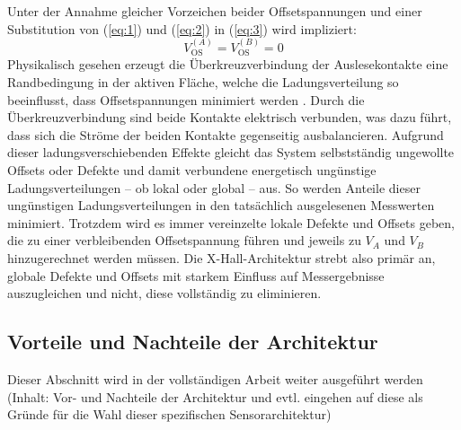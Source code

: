 \documentclass[12pt, a4paper]{article}
\begin{document}
		Unter der Annahme gleicher Vorzeichen beider Offsetspannungen und einer Substitution von (\ref{eq:1}) und (\ref{eq:2}) in (\ref{eq:3}) wird  impliziert:
		\begin{equation}
			V_\mathrm{OS}^{(A)}=V_\mathrm{OS}^{(B)}=0
			\label{eq:4}
		\end{equation}
		Physikalisch gesehen erzeugt die Überkreuzverbindung der Auslesekontakte eine  Randbedingung in der aktiven Fläche, welche die Ladungsverteilung so beeinflusst, dass Offsetspannungen minimiert werden \cite{cres21}. 
		Durch die Überkreuzverbindung sind beide Kontakte elektrisch verbunden, was dazu führt, dass sich die Ströme der beiden Kontakte gegenseitig ausbalancieren. %
		Aufgrund dieser ladungsverschiebenden Effekte gleicht das System selbstständig ungewollte Offsets oder Defekte und damit verbundene energetisch ungünstige Ladungsverteilungen – ob lokal oder global – aus. %
		So werden Anteile dieser ungünstigen Ladungsverteilungen in den tatsächlich ausgelesenen Messwerten minimiert.\newline
		Trotzdem wird es immer vereinzelte lokale Defekte und Offsets geben, die zu einer verbleibenden Offsetspannung führen und jeweils zu $V_A$ und $V_B$ hinzugerechnet werden müssen. Die X-Hall-Architektur strebt also primär an, globale Defekte und Offsets mit starkem Einfluss auf Messergebnisse auszugleichen und nicht, diese vollständig zu eliminieren\cite{cres21}.
		
		\subsection{Vorteile und Nachteile der Architektur}
			\centering
		Dieser Abschnitt wird in der vollständigen Arbeit weiter ausgeführt werden (Inhalt: Vor- und Nachteile der Architektur und evtl. eingehen auf diese als Gründe für die Wahl dieser spezifischen Sensorarchitektur)
		
		
		
		
		
\end{document}
